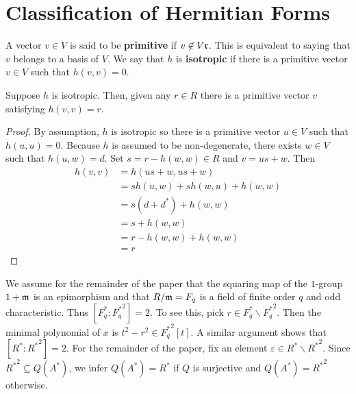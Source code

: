 
\section{Classification of Hermitian Forms}
A vector $v \in V$ is said to be \textbf{primitive} if $v \not\in V \mathfrak{r}$.
This is equivalent to saying that $v$ belongs to a basis of $V$.
We say that $h$ is \textbf{isotropic} if there is a primitive vector $v \in V$ such that $h(v,v) = 0$.

\begin{lemma}\label{lemma3.1}
Suppose $h$ is isotropic. Then, given any $r \in R$ there is a primitive vector $v$ satisfying $h(v,v) = r$.
\end{lemma}

\begin{proof}
By assumption, $h$ is isotropic so there is a primitive vector $u \in V$ such that $h(u,u) = 0$.
Because $h$ is assumed to be non-degenerate, there exists $w \in V$ such that $h(u,w) = d$.
Set $s = r - h(w,w) \in R$ and $v = us + w$.
Then
\begin{align*}
h(v,v) &= h(us + w, us + w) \\
&= sh(u,w) + sh(w,u) + h(w,w) \\
&= s(d + d^*) + h(w,w) \\
&= s + h(w,w)\\
&= r - h(w,w) + h(w,w)\\
&= r
\end{align*}
\end{proof}

We assume for the remainder of the paper that the squaring map of the $1$-group $1 + \mathfrak{m}$ is an epimorphism and that $R/\mathfrak{m} = F_q$
is a field of finite order $q$ and odd characteristic.
Thus $[F_q^* : {F_q^*}^2] = 2$. To see this, pick $r \in F_q^* \backslash {F_q^*}^2$.
Then the minimal polynomial of $x$ is $t^2 - r^2 \in {F_q^*}^2[t]$.
A similar argument shows that $[R^* : {R^*}^2] = 2$.
For the remainder of the paper, fix an element $\varepsilon \in R^* \backslash {R^*}^2$.
Since ${R^*}^2 \subseteq Q(A^*)$, we infer $Q(A^*) = R^*$ if $Q$ is surjective and $Q(A^*) = {R^*}^2$ otherwise.


